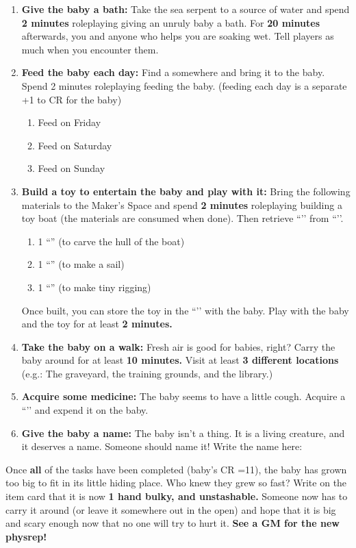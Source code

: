 \documentclass[green]{GL2020}
\begin{document}
\begin{enumerate}
  \item \textbf{Give the baby a bath:} Take the sea serpent to a source of water and spend \textbf{2 minutes} roleplaying giving an unruly baby a bath. For \textbf{20 minutes} afterwards, you and anyone who helps you are soaking wet. Tell players as much when you encounter them.
  \item \textbf{Feed the baby each day:} Find a \iFish{\MYname} somewhere and bring it to the baby. Spend 2 minutes roleplaying feeding the baby. (feeding each day is a separate +1 to CR for the baby)
  \begin{enumerate}
    \item Feed on Friday
    \item Feed on Saturday
    \item Feed on Sunday
  \end{enumerate}
  \item \textbf{Build a toy to entertain the baby and play with it:} Bring the following materials to the Maker's Space and spend \textbf{2 minutes} roleplaying building a toy boat (the materials are consumed when done). Then retrieve ``\iToyBoat{}’’ from ``\sSignH{}’’.
  \begin{enumerate}
    \item 1 ``\iWoodenBlock{}'' (to carve the hull of the boat)
    \item 1 ``\iEagleFeather{}'' (to make a sail)
    \item 1 ``\iSpiderWeb{}'' (to make tiny rigging)
  \end{enumerate}
  Once built, you can store the toy in the ``\sStudentBookCaseTwo{}’’ with the baby. Play with the baby and the toy for at least \textbf{2 minutes.}
  \item \textbf{Take the baby on a walk:} Fresh air is good for babies, right? Carry the baby around for at least \textbf{10 minutes.} Visit at least \textbf{3 different locations} (e.g.: The graveyard, the training grounds, and the library.)
  \item \textbf{Acquire some medicine:} The baby seems to have a little cough. Acquire a ``\iStrength{}’’ and expend it on the baby.
  \item \textbf{Give the baby a name:} The baby isn’t a thing. It is a living creature, and it deserves a name. Someone should name it! Write the name here: \underline{\hspace{2cm}}
\end{enumerate}

Once \textbf{all} of the tasks have been completed (baby’s CR =11), the baby has grown too big to fit in its little hiding place. Who knew they grew so fast? Write on the item card that it is now \textbf{1 hand bulky, and unstashable.} Someone now has to carry it around (or leave it somewhere out in the open) and hope that it is big and scary enough now that no one will try to hurt it. \textbf{See a GM for the new physrep!}
\end{document}
